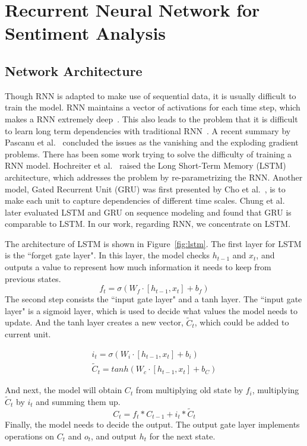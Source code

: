 \section{Recurrent Neural Network for Sentiment Analysis}

\subsection{Network Architecture}
Though RNN is adapted to make use of sequential data, it is usually difficult to train the model. RNN maintains a vector of activations for each time step, which makes a RNN extremely deep~\cite{jozefowicz2015}. This also leads to the problem that it is difficult to learn long term dependencies with traditional RNN~\cite{bengio1994}. A recent summary by Pascanu et al.~\cite{pascanu2012} concluded the issues as the vanishing and the exploding gradient problems. There has been some work trying to solve the difficulty of training a RNN model. Hochreiter et al.~\cite{hochreiter1997} raised the Long Short-Term Memory (LSTM) architecture, which addresses the problem by re-parametrizing the RNN. Another model, Gated Recurrent Unit (GRU) was first presented by Cho et al.~\cite{cho2014}, is to make each unit to capture dependencies of different time scales. Chung et al.~\cite{chung2014} later evaluated LSTM and GRU on sequence modeling and found that GRU is comparable to LSTM. In our work, regarding RNN, we concentrate on LSTM.

The architecture of LSTM is shown in Figure~\ref{fig:lstm}. The first layer for LSTM is the ``forget gate layer". In this layer, the model checks $h_{t-1}$ and $x_t$, and outputs a value to represent how much information it needs to keep from previous states. 
$$f_t = \sigma (W_f \cdot [h_{t-1}, x_t] + b_f)$$
The second step consists the ``input gate layer" and a tanh layer. The ``input gate layer" is a sigmoid layer, which is used to decide what values the model needs to update. And the tanh layer creates a new vector, $\tilde{C}_t$, which could be added to current unit.
 
\begin{align*}
i_t = \sigma (W_i \cdot [h_{t-1}, x_t] + b_i) \\
\tilde{C}_t = tanh(W_c \cdot [h_{t-1}, x_t] + b_C)
\end{align*}

And next, the model will obtain $C_t$ from multiplying old state by $f_i$, multiplying $\tilde{C}_t$ by $i_t$ and summing them up. 
$$C_t = f_t * C_{t-1} + i_t * \tilde{C}_t$$
Finally, the model needs to decide the output. The output gate layer implements operations on $C_t$ and $o_t$, and output $h_t$ for the next state.

